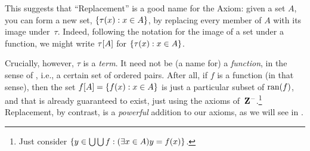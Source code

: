 \documentclass[../../../include/open-logic-section]{subfiles}
\begin{document}
This suggests that ``Replacement'' is a good name for the Axiom: given
a set $A$, you can form a new set, $\{ \tau(x) : x \in A \}$, by
replacing every member of $A$ with its image under~$\tau$. Indeed,
following the notation for the image of a set under a function, we
might write $\tau[A]$ for $\{ \tau(x) : x \in A \}$.

Crucially, however, $\tau$ is a \emph{term}. It need not be (a name
for) a \emph{function}, in the sense of ,
i.e., a certain set of ordered pairs. After all, if $f$ is a function
(in that sense), then the set $f[A] = \{ f(x) : x \in
A \}$ is just a particular subset of $\mathrm{ran}(f)$, and that is already
guaranteed to exist, just using the axioms of~$\mathbf{Z}^{-}$.\footnote{Just
consider $\{ y \in \bigcup \bigcup f : (\exists x \in A)y =
f(x) \}$.} Replacement, by contrast, is a \emph{powerful} addition to
our axioms, as we will see in .
\end{document}
